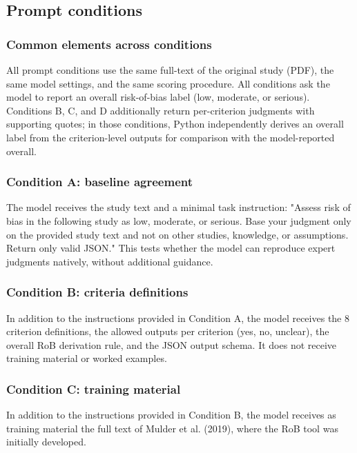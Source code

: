 \documentclass[11pt,a4paper]{article}
\begin{document}
\subsection{Prompt conditions}

\subsubsection{Common elements across conditions}

All prompt conditions use the same full-text of the original study (PDF), the same model settings, and the same scoring procedure. All conditions ask the model to report an overall risk-of-bias label (low, moderate, or serious). Conditions B, C, and D additionally return per-criterion judgments with supporting quotes; in those conditions, Python independently derives an overall label from the criterion-level outputs for comparison with the model-reported overall.

\subsubsection{Condition A: baseline agreement}

The model receives the study text and a minimal task instruction: "Assess risk of bias in the following study as low, moderate, or serious. Base your judgment only on the provided study text and not on other studies, knowledge, or assumptions. Return only valid JSON." This tests whether the model can reproduce expert judgments natively, without additional guidance.

\subsubsection{Condition B: criteria definitions}

In addition to the instructions provided in Condition A, the model receives the 8 criterion definitions, the allowed outputs per criterion (yes, no, unclear), the overall RoB derivation rule, and the JSON output schema. It does not receive training material or worked examples.

\subsubsection{Condition C: training material}

In addition to the instructions provided in Condition B, the model receives as training material the full text of Mulder et al. (2019), where the RoB tool was initially developed.
\end{document}
